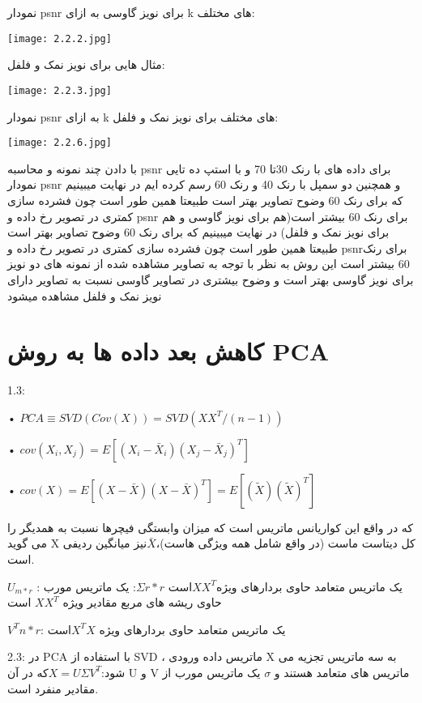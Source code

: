 نمودار psnr برای نویز گاوسی به ازای k های مختلف:
\begin{center}
    \texttt{[image: 2.2.2.jpg]}
\end{center}

مثال هایی برای نویز نمک و فلفل:

\begin{center}
    \texttt{[image: 2.2.3.jpg]}
\end{center}

نمودار psnr به ازای k های مختلف برای نویز نمک و فلفل:
\begin{center}
    \texttt{[image: 2.2.6.jpg]}
\end{center}

با دادن چند نمونه و محاسبه  psnr  برای داده های با رنک 30تا 70 و با استپ ده تایی نمودار  psnr و همچنین دو سمپل  با رنک 40 و رنک 60 رسم کرده ایم در نهایت میبینیم که برای رنک 60 وضوح تصاویر بهتر است طبیعتا همین طور است چون فشرده سازی کمتری در تصویر رخ داده و  psnr  برای رنک 60 بیشتر است(هم برای نویز گاوسی و هم برای نویز نمک و فلفل)
در نهایت میبینیم که برای رنک 60 وضوح تصاویر بهتر است طبیعتا همین طور است چون فشرده سازی کمتری در تصویر رخ داده و psnrبرای رنک 60 بیشتر است این روش به نظر با توجه به تصاویر مشاهده شده از نمونه های دو نویز برای نویز گاوسی بهتر است و وضوح بیشتری در تصاویر گاوسی نسبت به تصاویر دارای نویز نمک و فلفل مشاهده میشود

\section{کاهش بعد داده ها به روش PCA}
\large

1.3:

• $ PCA \equiv SVD(Cov(X)) = SVD(XX^T/(n-1))$

• $ cov(X_i,X_j) = E[(X_i-\bar X_i)(X_j-\bar X_j)^T]  $

• $ cov(X) = E[(X-\bar X)(X-\bar X)^T] = E[(\tilde X)(\tilde X)^T] $

که در واقع این کواریانس ماتریس است که میزان وابستگی فیچرها نسبت به همدیگر را می گوید X کل دیتاست ماست (در واقع شامل همه ویژگی هاست)،$ \bar X $نیز میانگین ردیفی است.

$U_{m*r} $ :
 یک ماتریس متعامد حاوی بردارهای ویژه$ XX^T $است
 $ \Sigma{r*r}  $:
 یک ماتریس مورب حاوی ریشه های مربع مقادیر ویژه $ XX^T $ است

 $V^T{n*r} $:
 یک ماتریس متعامد حاوی بردارهای ویژه $X^TX $است

2.3:
در PCA با استفاده از SVD ، ماتریس داده ورودی X به سه ماتریس تجزیه می شود:$ X = UΣV^T $که در آن U و V ماتریس های متعامد هستند و $\sigma$ یک ماتریس مورب از مقادیر منفرد است.

